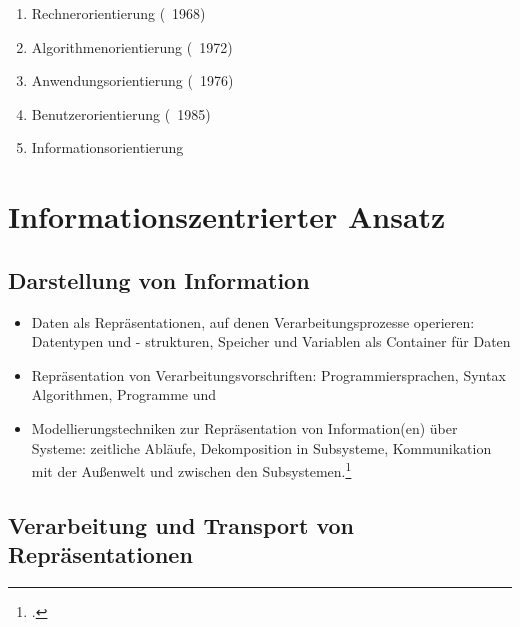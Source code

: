 \documentclass{lehramt-informatik-haupt}
\begin{document}
\begin{enumerate}
\item Rechnerorientierung (~1968)
\item Algorithmenorientierung (~1972)
\item Anwendungsorientierung (~1976)
\item Benutzerorientierung (~1985)
\item Informationsorientierung
\end{enumerate}

%

\section{Informationszentrierter Ansatz}

%

\subsection{Darstellung von Information}
\begin{itemize}
\item Daten als Repräsentationen, auf denen Verarbeitungsprozesse
operieren: Datentypen und - strukturen, Speicher und Variablen als
Container für Daten

\item Repräsentation von Verarbeitungsvorschriften: Programmiersprachen,
Syntax Algorithmen, Programme und

\item Modellierungstechniken zur Repräsentation von Information(en) über
Systeme: zeitliche Abläufe, Dekomposition in Subsysteme, Kommunikation
mit der Außenwelt und zwischen den Subsystemen.\footcite[Seite 26,
Hubwieser.2000]{ddi:fs:1}
\end{itemize}

%

\subsection{Verarbeitung und Transport von Repräsentationen}
\end{document}
